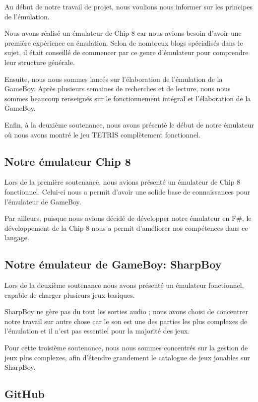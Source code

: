 \documentclass[12pt, a4paper]{article}
\begin{document}
Au début de notre travail de projet, nous voulions nous informer  sur les principes de l'émulation. 

\bigskip
Nous avons réalisé un émulateur de Chip 8 car nous avions besoin d'avoir une première expérience en émulation. Selon de nombreux blogs spécialisés dans le sujet, il était conseillé de commencer par ce genre d'émulateur pour comprendre leur structure générale.



\bigskip
Ensuite, nous nous sommes lancés sur l'élaboration de l'émulation de la GameBoy. Après plusieurs semaines de recherches et de lecture, nous nous sommes beaucoup renseignés sur le fonctionnement intégral et l'élaboration de la GameBoy.

\bigskip
Enfin, à la deuxième soutenance, nous avons présenté le début de notre émulateur où nous avons montré le jeu TETRIS complètement fonctionnel.

\pagebreak
\subsection{Notre émulateur Chip 8}
Lors de la première soutenance, nous avions présenté un émulateur de Chip 8 fonctionnel. Celui-ci nous a permit d'avoir une solide base de connaissances pour l'émulateur de GameBoy.

Par ailleurs, puisque nous avions décidé de développer notre émulateur en F\#, le développement de la Chip 8 nous a permit d'améliorer nos compétences dans ce langage.



\subsection{Notre émulateur de GameBoy: SharpBoy}

Lors de la deuxième soutenance nous avons présenté un émulateur fonctionnel, capable de charger plusieurs jeux basiques.

SharpBoy ne gère pas du tout les sorties audio ; nous avons choisi de concentrer notre travail sur autre chose car le son est une des parties les plus complexes de l'émulation et il n'est pas essentiel pour la majorité des jeux.
\medskip

Pour cette troisième soutenance, nous nous sommes concentrés sur la gestion de jeux plus complexes, afin d'étendre grandement le catalogue de jeux jouables sur SharpBoy.

\subsection{GitHub }
\end{document}
